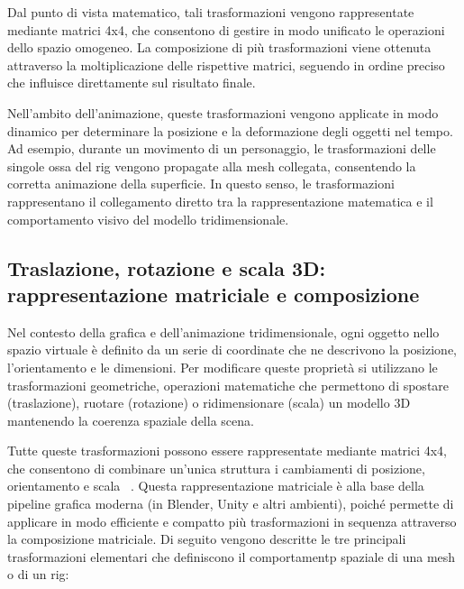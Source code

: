 Dal punto di vista matematico, tali trasformazioni vengono rappresentate mediante matrici 4x4, che consentono di gestire in modo unificato le operazioni dello spazio omogeneo. La composizione di più trasformazioni viene ottenuta attraverso la moltiplicazione delle rispettive matrici, seguendo in ordine preciso che influisce direttamente sul risultato finale.

Nell'ambito dell'animazione, queste trasformazioni vengono applicate in modo dinamico per determinare la posizione e la deformazione degli oggetti nel tempo. Ad esempio, durante un movimento di un personaggio, le trasformazioni delle singole ossa del rig vengono propagate alla mesh collegata, consentendo la corretta animazione della superficie. In questo senso, le trasformazioni rappresentano il collegamento diretto tra la rappresentazione matematica e il comportamento visivo del modello tridimensionale.


\subsection{Traslazione, rotazione e scala 3D: rappresentazione matriciale e composizione}
Nel contesto della grafica e dell'animazione tridimensionale, ogni oggetto nello spazio virtuale è definito da un serie di coordinate che ne descrivono la posizione, l'orientamento e le dimensioni. 
Per modificare queste proprietà si utilizzano le trasformazioni geometriche, operazioni matematiche che permettono di spostare (traslazione), ruotare (rotazione) o ridimensionare (scala) un modello 3D mantenendo la coerenza spaziale della scena.

Tutte queste trasformazioni possono essere rappresentate mediante matrici 4x4, che consentono di combinare un'unica struttura i cambiamenti di posizione, orientamento e scala ~\cite{tras}. Questa rappresentazione matriciale è alla base della pipeline grafica moderna (in Blender, Unity e altri ambienti), poiché permette di applicare in modo efficiente e compatto più trasformazioni in sequenza attraverso la composizione matriciale.
Di seguito vengono descritte le tre principali trasformazioni elementari che definiscono il comportamentp spaziale di una mesh o di un rig:

